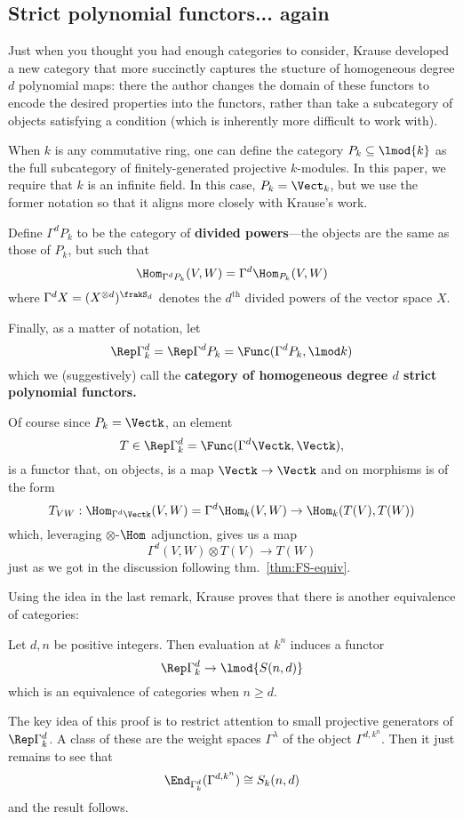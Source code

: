 \documentclass[12pt]{article}
\begin{document}
\subsection{Strict polynomial functors... again}
Just when you thought you had enough categories to consider, Krause developed a new category that more succinctly captures
the stucture of homogeneous degree $d$ polynomial maps: there the author changes the domain of these functors 
to encode the desired properties into the functors, rather than take a subcategory of objects satisfying a condition (which 
is inherently more difficult to work with).
\begin{defn}\label{defn:div-powers}
	When $k$ is any commutative ring, one can define the category $P_k\subseteq \lmod{k}$ as the full subcategory of finitely-generated projective $k$-modules.
	In this paper, we require that $k$ is an infinite field. In this case, $P_k=\Vect_k$, but we use the former notation so that 
	it aligns more closely with Krause's work.

	Define $\Gamma^d P_k$ to be the category of \textbf{divided powers}---the objects are the same as those of $P_k$, but such that 
	\[\Hom_{\Gamma^dP_k}(V,W)=\Gamma^d\Hom_{P_k}(V,W)\]
	where $\Gamma^d X=(X^{\otimes d})^{\frakS_d}$ denotes the \textbf{$d^{\text{th}}$} divided powers of the vector space $X$.

	Finally, as a matter of notation, let 
	\[\Rep\Gamma^d_k=\Rep\Gamma^dP_k=\Func(\Gamma^dP_k,\lmod k)\]
	which we (suggestively) call the \textbf{category of homogeneous degree $d$ strict polynomial functors.}
\end{defn}
\begin{rmk}\label{rmk:action}
	Of course since $P_k=\Vectk$, an element
	\[T\in\Rep\Gamma^d_k=\Func(\Gamma^d\Vectk,\Vectk),\]
	is a functor that, on objects, is a map $\Vectk\to \Vectk$ and on morphisms is of the form 
	\[T_{VW}:\Hom_{\Gamma^d\Vectk}(V,W)=\Gamma^d\Hom_k(V,W)\to \Hom_k(T(V),T(W))\]
	which, leveraging $\otimes$-$\Hom$ adjunction, gives us a map 
	\[\Gamma^d(V,W)\otimes T(V)\to T(W)\]
	just as we got in the discussion following thm.~\ref{thm:FS-equiv}.
\end{rmk}
Using the idea in the last remark, Krause proves that there is another equivalence of categories:
\begin{thm}
	Let $d,n$ be positive integers. Then evaluation at $k^n$ induces a functor 
	\[\Rep\Gamma^d_k\to \lmod{S(n,d)}\]
	which is an equivalence of categories when $n\ge d$.
\end{thm}
The key idea of this proof is to restrict attention to small projective generators of $\Rep\Gamma^d_k$. A class of these 
are the weight spaces $\Gamma^\lambda$ of the object $\Gamma^{d,k^n}$. Then it just remains to see that 
\[\End_{\Gamma^d_k}(\Gamma^{d,k^n})\cong S_k(n,d)\]
and the result follows.	
\end{document}
